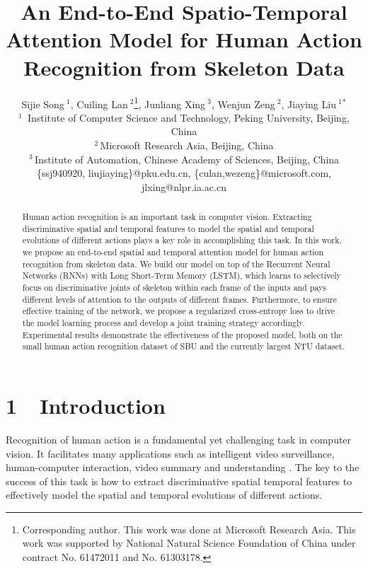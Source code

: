 \documentclass[letterpaper]{article}
\begin{document}
\title{An End-to-End Spatio-Temporal Attention Model for  Human Action Recognition from Skeleton Data}

\author{
	{Sijie Song{\small $~^{1}$}, Cuiling Lan{\small $~^{2}$}\thanks{Corresponding author. This work was done at Microsoft Research Asia. This work was supported by National Natural Science Foundation of China under contract No. 61472011 and No. 61303178.}, Junliang Xing{\small $~^{3}$}, Wenjun Zeng{\small $~^{2}$}}, Jiaying Liu{\small $~^{1}$\large$^{*}$} \\
	$^{1}$\	Institute of Computer Science and Technology, Peking University, Beijing, China \\
    $^{2}$\,Microsoft Research Asia, Beijing, China \\
	$^{3}$\,Institute of Automation, Chinese Academy of Sciences, Beijing, China \\	
	\{ssj940920, liujiaying\}@pku.edu.cn,
	\{culan,wezeng\}@microsoft.com,
	jlxing@nlpr.ia.ac.cn
}


\maketitle
\begin{abstract}
Human action recognition is an important task in computer vision. Extracting discriminative spatial and temporal features to model the spatial and temporal evolutions of different actions plays a key role in accomplishing this task. In this work, we propose an end-to-end spatial and temporal attention model for human action recognition from skeleton data. We build our model on top of the Recurrent Neural Networks (RNNs) with Long Short-Term Memory (LSTM), which learns to selectively focus on discriminative joints of skeleton within each frame of the inputs and pays different levels of attention to the outputs of different frames. Furthermore, to ensure effective training of the network, we propose a regularized cross-entropy loss to drive the model learning process and develop a joint training strategy accordingly. Experimental results demonstrate the effectiveness of the proposed model, both on the small human action recognition dataset of SBU and the currently largest NTU dataset.


\end{abstract}


\section{1~~Introduction}
\label{sec:introduction}
Recognition of human action is a fundamental yet challenging task in computer vision. It facilitates many applications such as intelligent video surveillance, human-computer interaction, video summary and understanding \cite{IVC10SurveyAction,CVIU11SurveyAction}. The key to the success of this task is how to extract discriminative spatial temporal features to effectively model the spatial and temporal evolutions of different actions.
\end{document}
